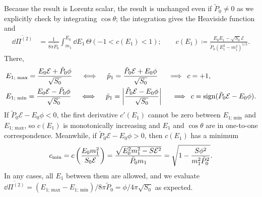 \documentclass[CheatSheet]{subfiles}
\begin{document}
Because the result is Lorentz scalar, the result is unchanged even if $\tilde P_0\neq 0$ as we explicitly check by integrating $\cos\theta$; the integration gives the Heaviside function and
\begin{align}
 \overline{\dd\Pi^{(2)}}
&=
   \frac{1}{8\pi\tilde P_0}\int_{m_1}^{E_0}{\dd E_1}\,
  \Theta\left(-1<c(E_1)<1\right);\qquad
  c(E_1)\coloneq \frac{E_0E_1-\sqrt{S_0}\mathcal E}{\tilde P_0(E_1^2-m_1^2)^{1/2}}.
\end{align}
There,
\begin{align}
  &E_{\text{1; max}}=\frac{E_0\mathcal E+\tilde P_0\phi}{\sqrt {S_0}}
  \quad\iff\quad
\tilde p_1=\frac{\tilde P_0\mathcal E+E_0\phi}{\sqrt{S_0}}
  \quad\then c=+1,
\\&
  E_{\text{1; min}}=\frac{E_0\mathcal E-\tilde P_0\phi}{\sqrt {S_0}}
  \quad\iff\quad
\tilde p_1=\left|\frac{\tilde P_0\mathcal E-E_0\phi}{\sqrt{S_0}}\right|
  \quad\then c = \sign(\tilde P_0\mathcal E-E_0\phi).
\end{align}
If $\tilde P_0\mathcal E-E_0\phi<0$, the first derivative $c'(E_1)$ cannot be zero between $E_{\text{1; min}}$ and $E_{\text{1; max}}$, so $c(E_1)$ is monotonically increasing and $E_1$ and $\cos\theta$ are in one-to-one correspondence. Meanwhile, if $\tilde P_0\mathcal E-E_0\phi>0$, then $c(E_1)$ has a minimum
\begin{equation}
  c\w{min}=c\left(\frac{E_0m_1^2}{S_0\mathcal E}\right)
  = \frac{\sqrt{E_0^2 m_1^2-S \mathcal E^2}}{\tilde P_0 m_1}=\sqrt{1-\frac{S \phi ^2}{m_1^2\tilde P_0^2}}.
\end{equation}
In any cases, all $E_1$ between them are allowed, and we evaluate $\overline{\dd\Pi^{(2)}}
=
   (E_{\text{1; max}}-E_{\text{1; min}})/8\pi\tilde P_0=\phi/4\pi\sqrt{S_0}$ as expected.
\end{document}
